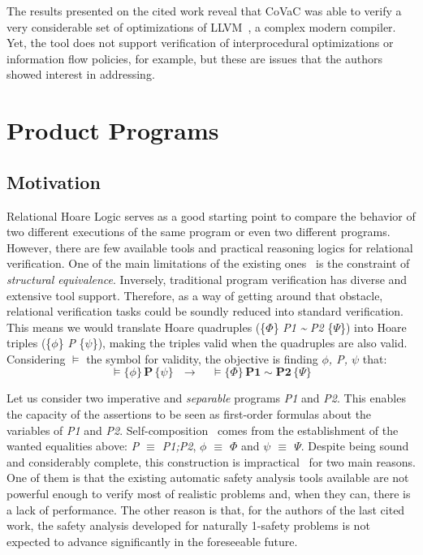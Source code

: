 The results presented on the cited work reveal that CoVaC was able to verify a very considerable set of optimizations of LLVM~\cite{llvm}, a complex modern compiler.
Yet, the tool does not support verification of interprocedural optimizations or information flow policies, for example, but these are issues that the authors showed interest in addressing.


\section{Product Programs} 
\label{sec:product_programs}

\subsection{Motivation} 
\label{subsec:product_programs_motivation}

Relational Hoare Logic serves as a good starting point to compare the behavior of two different executions of the same program or even two different programs.
However, there are few available tools and practical reasoning logics for relational verification.
One of the main limitations of the existing ones~\cite{DBLP:conf/popl/Benton04, DBLP:journals/tcs/Yang07} is the constraint of \emph{structural equivalence}.
Inversely, traditional program verification has diverse and extensive tool support.
Therefore, as a way of getting around that obstacle, relational verification tasks could be soundly reduced into standard verification.
This means we would translate Hoare quadruples (\{$\Phi$\} \emph{P1} \emph{\textasciitilde} \emph{P2} \{$\Psi$\}) into Hoare triples (\{$\phi$\} \emph{P} \{$\psi$\}), making the triples valid when the quadruples are also valid.
Considering $\vDash$ the symbol for validity, the objective is finding \emph{$\phi$, P, $\psi$} that:
\[ \vDash \{\phi\} \, \textbf{P} \, \{\psi\} \ \ \ \rightarrow \ \ \ \ \ \vDash \{\Phi\} \, \textbf{P1} \sim \textbf{P2} \, \{\Psi\} \]

Let us consider two imperative and \emph{separable} programs \emph{P1} and \emph{P2}.
This enables the capacity of the assertions to be seen as first-order formulas about the variables of \emph{P1} and \emph{P2}.
Self-composition~\cite{DBLP:conf/csfw/BartheDR04} comes from the establishment of the wanted equalities above: \emph{P $\equiv$ P1;P2}, \emph{$\phi$ $\equiv$ $\Phi$} and \emph{$\psi$ $\equiv$ $\Psi$}.
Despite being sound and considerably complete, this construction is impractical~\cite{DBLP:conf/sas/TerauchiA05} for two main reasons.
One of them is that the existing automatic safety analysis tools available are not powerful enough to verify most of realistic problems and, when they can, there is a lack of performance.
The other reason is that, for the authors of the last cited work, the safety analysis developed for naturally 1-safety problems is not expected to advance significantly in the foreseeable future.

